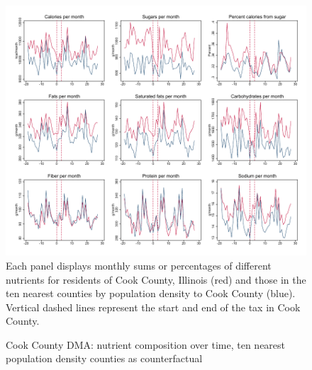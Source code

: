 \documentclass[12pt]{article}
\begin{document}
\clearpage
\begin{figure}[t]
\begin{center}
\caption{Cook County DMA: nutrient composition over time, ten nearest population density counties as counterfactual}
\label{cook_panelist_nutr_counties_dense}
\includegraphics[width=1\textwidth, angle=0]{../figures/panelist_nutr_counties_dense.pdf}
\footnotesize Each panel displays monthly sums or percentages of different nutrients for residents of Cook County, Illinois (red) and those in the ten nearest counties by population density to Cook County (blue). Vertical dashed lines represent the start and end of the tax in Cook County.
\end{center}
\end{figure}
\end{document}
